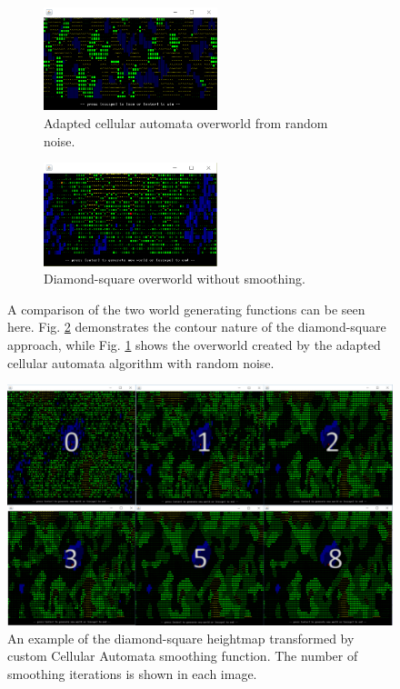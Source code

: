 \documentclass[12pt,a4paper]{article}
\begin{document}
\begin{figure}
\centering
\begin{subfigure}{.4\textwidth}
  \centering
  \includegraphics[width=.65\linewidth, height=3cm]{images/undersmoothing.png}
  \caption{Adapted cellular automata overworld from random noise.}
  \label{fig:4sub1}
\end{subfigure}
\hspace{20px}
\begin{subfigure}{.4\textwidth}
  \centering
  \includegraphics[width=.65\linewidth, height=3cm]{images/nosmoothingsmall.png}
  \caption{Diamond-square overworld without smoothing.}
  \label{fig:4sub2}
\end{subfigure}
\caption{A comparison of the two world generating functions can be seen here. Fig. \ref{fig:4sub2} demonstrates the contour nature of the diamond-square approach, while Fig. \ref{fig:4sub1} shows the overworld created by the adapted cellular automata algorithm with random noise.}
\label{fig:4}
\end{figure}

\begin{figure}
  \centering
 	\includegraphics[width=0.8\linewidth]{images/smoothing.png}
	\caption[]{An example of the diamond-square heightmap transformed by custom Cellular Automata smoothing function. The number of smoothing iterations is shown in each image.}
	\label{fig:5}
\end{figure} 
\end{document}
